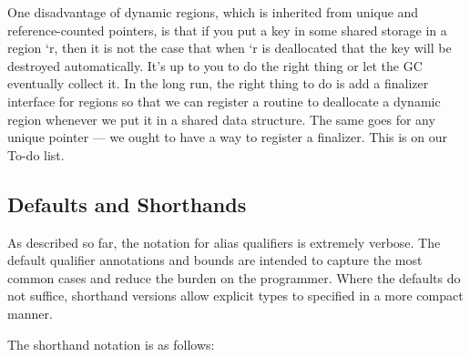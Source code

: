 One disadvantage of dynamic regions, which is inherited from unique and
reference-counted pointers, is that if you put a key in some shared storage
in a region `r, then it is not the case that when `r is deallocated that the
key will be destroyed automatically.  It's up to you to do the right thing
or let the GC eventually collect it.  In the long run, the right thing to do
is add a finalizer interface for regions so that we can register a routine
to deallocate a dynamic region whenever we put it in a shared data
structure.  The same goes for any unique pointer --- we ought to have a way
to register a finalizer.  This is on our To-do list.


\subsection{Defaults and Shorthands}

As described so far, the notation for alias qualifiers is extremely
verbose. The default qualifier annotations and bounds are intended to
capture the most common cases and reduce the burden on the
programmer. Where the defaults do not suffice, shorthand versions
allow explicit types to specified in a more compact manner. 

The shorthand notation is as follows:

